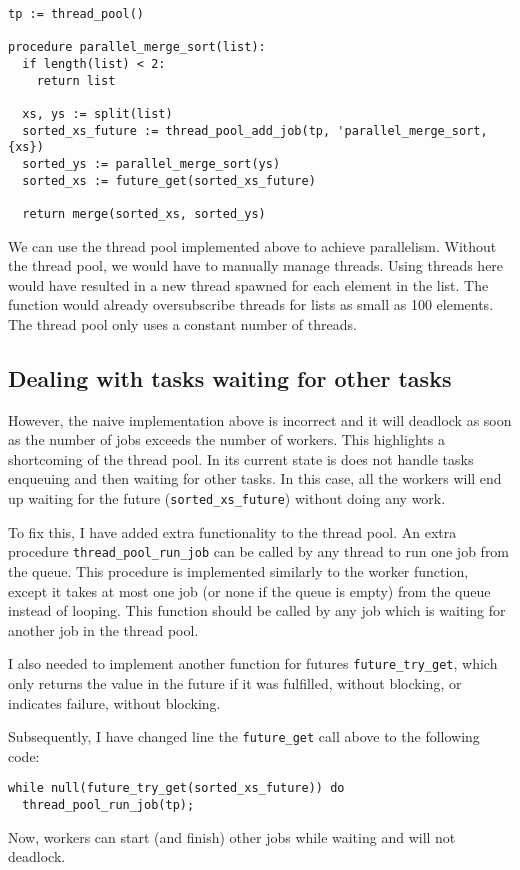 \begin{verbatim}
tp := thread_pool()

procedure parallel_merge_sort(list):
  if length(list) < 2:
    return list

  xs, ys := split(list)
  sorted_xs_future := thread_pool_add_job(tp, 'parallel_merge_sort, {xs})
  sorted_ys := parallel_merge_sort(ys)
  sorted_xs := future_get(sorted_xs_future)

  return merge(sorted_xs, sorted_ys)
\end{verbatim}

We can use the thread pool implemented above to achieve parallelism. Without the thread pool, we would
have to manually manage threads. Using threads here would have resulted in a new thread spawned for
each element in the list. The function would already oversubscribe threads for lists as small as
100 elements. The thread pool only uses a constant number of threads.

\subsection{Dealing with tasks waiting for other tasks}

However, the naive implementation above is incorrect and it will deadlock as soon as the number of
jobs exceeds the number of workers. This highlights a shortcoming of the thread pool. In its current
state is does not handle tasks enqueuing and then waiting for other tasks. In this case, all the workers
will end up waiting for the future (\verb|sorted_xs_future|) without doing any work.

To fix this, I have added extra functionality to the thread pool. An extra procedure \verb|thread_pool_run_job|
can be called by any thread to run one job from the queue. This procedure is implemented similarly
to the worker function, except it takes at most one job (or none if the queue is empty) from the
queue instead of looping.
This function should be called by any job which is waiting for another job in the thread pool.

I also needed to implement another function for futures \verb|future_try_get|, which only returns the
value in the future if it was fulfilled, without blocking, or indicates failure, without blocking.

Subsequently, I have changed line the \verb|future_get| call above to the following code:
\begin{verbatim}
while null(future_try_get(sorted_xs_future)) do
  thread_pool_run_job(tp);
\end{verbatim}
Now, workers can start (and finish) other jobs while waiting and will not deadlock.

